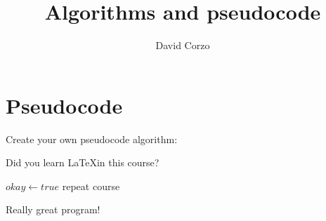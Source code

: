 \documentclass{article}
\title{Algorithms and pseudocode}
\author{David Corzo}
\date{}
\begin{document}
\maketitle

\section{Pseudocode}

Create your own pseudocode algorithm:

Did you learn \LaTeX in this course?

\begin{algorithmic}
	\State $okay \gets true$
\Else
		\State repeat course
	\EndWhile
\EndIf
\end{algorithmic}

Really great program!
\end{document}
